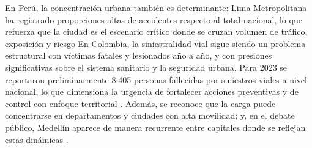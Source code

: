 En Perú, la concentración urbana también es determinante: Lima Metropolitana ha registrado proporciones altas de accidentes respecto al total nacional, lo que refuerza que la ciudad es el escenario crítico donde se cruzan volumen de tráfico, exposición y riesgo 
En Colombia, la siniestralidad vial sigue siendo un problema estructural con víctimas fatales y lesionados año a año, y con presiones significativas sobre el sistema sanitario y la seguridad urbana. Para 2023 se reportaron preliminarmente 8.405 personas fallecidas por siniestros viales a nivel nacional, lo que dimensiona la urgencia de fortalecer acciones preventivas y de control con enfoque territorial \cite{betancourt2021}. Además, se reconoce que la carga puede concentrarse en departamentos y ciudades con alta movilidad; y, en el debate público, Medellín aparece de manera recurrente entre capitales donde se reflejan estas dinámicas \cite{valencia2025}.\\
 
